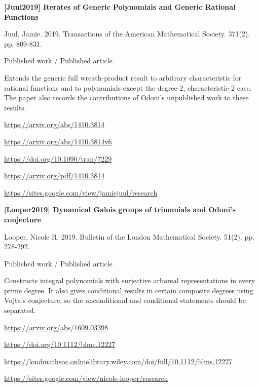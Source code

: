 \documentclass[11pt,a4paper,oneside,openany]{book}
\begin{document}
\vspace{9pt}
\hypertarget{ref:Juul2019}{}
{\sffamily\bfseries\color{atlasgreen}[Juul2019] Iterates of Generic Polynomials and Generic Rational Functions}\par
\color{black} Juul, Jamie. 2019. Transactions of the American Mathematical Society. 371(2). pp. 809-831.\par
{\small\sffamily\color{atlasgold}Published work / Published article}\par
\color{black} Extends the generic full wreath-product result to arbitrary characteristic for rational functions and to polynomials except the degree-2, characteristic-2 case. The paper also records the contributions of Odoni's unpublished work to these results.\par
{\footnotesize\url{https://arxiv.org/abs/1410.3814}}\par
{\footnotesize\url{https://arxiv.org/abs/1410.3814v6}}\par
{\footnotesize\url{https://doi.org/10.1090/tran/7229}}\par
{\footnotesize\url{https://arxiv.org/pdf/1410.3814}}\par
{\footnotesize\url{https://sites.google.com/view/jamiejuul/research}}\par
\vspace{9pt}
\hypertarget{ref:Looper2019}{}
{\sffamily\bfseries\color{atlasgreen}[Looper2019] Dynamical Galois groups of trinomials and Odoni's conjecture}\par
\color{black} Looper, Nicole R. 2019. Bulletin of the London Mathematical Society. 51(2). pp. 278-292.\par
{\small\sffamily\color{atlasgold}Published work / Published article}\par
\color{black} Constructs integral polynomials with surjective arboreal representations in every prime degree. It also gives conditional results in certain composite degrees using Vojta's conjecture, so the unconditional and conditional statements should be separated.\par
{\footnotesize\url{https://arxiv.org/abs/1609.03398}}\par
{\footnotesize\url{https://doi.org/10.1112/blms.12227}}\par
{\footnotesize\url{https://londmathsoc.onlinelibrary.wiley.com/doi/full/10.1112/blms.12227}}\par
{\footnotesize\url{https://sites.google.com/view/nicole-looper/research}}\par
\end{document}
